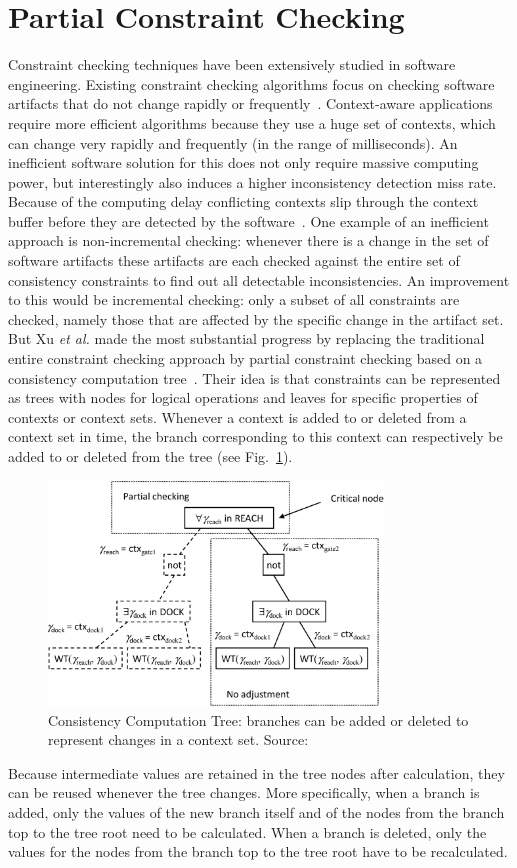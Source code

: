 \documentclass[journal]{vgtc}                %
\begin{document}
\section{Partial Constraint Checking}
Constraint checking techniques have been extensively studied in software engineering. Existing constraint checking algorithms focus on checking software artifacts that do not change rapidly or frequently~\cite{xu:2010:PCC}. Context-aware applications require more efficient algorithms because they use a huge set of contexts, which can change very rapidly and frequently (in the range of milliseconds). An inefficient software solution for this does not only require massive computing power, but interestingly also induces a higher inconsistency detection miss rate. Because of the computing delay conflicting contexts slip through the context buffer before they are detected by the software~\cite{xu:2010:PCC}. One example of an inefficient approach is non-incremental checking: whenever there is a change in the set of software artifacts these artifacts are each checked against the entire set of consistency constraints to find out all detectable inconsistencies. An improvement to this would be incremental checking: only a subset of all constraints are checked, namely those that are affected by the specific change in the artifact set. But Xu \textit{et al.} made the most substantial progress by replacing the traditional entire constraint checking approach by partial constraint checking based on a consistency computation tree~\cite{xu:2010:PCC}. Their idea is that constraints can be represented as trees with nodes for logical operations and leaves for specific properties of contexts or context sets. Whenever a context is added to or deleted from a context set in time, the branch corresponding to this context can respectively be added to or deleted from the tree (see Fig.~\ref{fig:cct}). 
\begin{figure}[htb]
  \centering
  \includegraphics[width=3.5in]{cons_comp_tree}
  \caption{Consistency Computation Tree: branches can be added or deleted to represent changes in a context set. Source:~\cite{xu:2010:PCC}}
  \label{fig:cct}
\end{figure}
Because intermediate values are retained in the tree nodes after calculation, they can be reused whenever the tree changes. More specifically, when a branch is added, only the values of the new branch itself and of the nodes from the branch top to the tree root need to be calculated. When a branch is deleted, only the values for the nodes from the branch top to the tree root have to be recalculated. 
\end{document}
